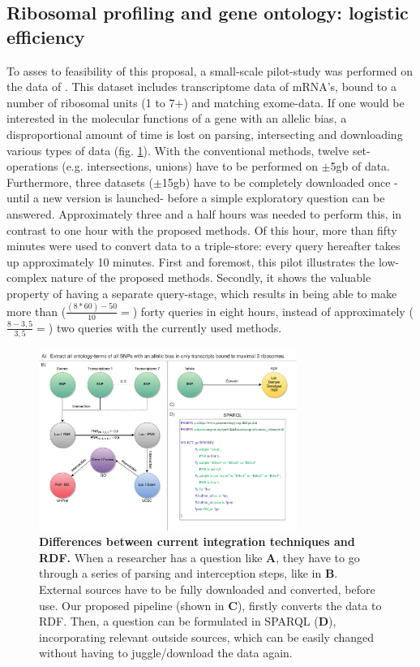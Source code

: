 \documentclass[twoside,fontsize=12pt]{article}
\begin{document}
\subsection*{Ribosomal profiling and gene ontology: logistic efficiency}
To asses to feasibility of this proposal, a small-scale pilot-study was performed on the data of \citet{VanHeesch2014}. This dataset includes transcriptome data of mRNA's, bound to a number of ribosomal units (1 to 7+) and matching exome-data. If one would be interested in the molecular functions of a gene with an allelic bias, a disproportional amount of time is lost on parsing, intersecting and downloading various types of data (fig. \ref{fig:awesome_image}). With the conventional methods, twelve set-operations (e.g. intersections, unions) have to be performed on $\pm$5gb of data. Furthermore, three datasets ($\pm$15gb) have to be completely downloaded once -until a new version is launched- before a simple exploratory question can be answered. Approximately three and a half hours was needed to perform this, in contrast to one hour with the proposed methods. Of this hour, more than fifty minutes were used to convert data to a triple-store: every query hereafter takes up approximately 10 minutes. First and foremost, this pilot illustrates the low-complex nature of the proposed methods. Secondly, it shows the valuable property of having a separate query-stage, which results in being able to make more than ($\frac{(8*60)-50}{10}= $) forty queries in eight hours, instead of approximately ($\frac{8-3,5}{3,5}= $) two queries with the currently used methods.
\begin{figure}[h!]
    \centering
    \includegraphics[width=0.75\textwidth]{DifferencesInDoingThings}
    \caption{\textbf{Differences between current integration techniques and RDF.} When a researcher has a question like \textbf{A}, they have to go through a series of parsing and interception steps, like in \textbf{B}. External sources have to be fully downloaded and converted, before use. Our proposed pipeline (shown in \textbf{C}), firstly converts the data to RDF. Then, a question can be formulated in SPARQL (\textbf{D}), incorporating relevant outside sources, which can be easily changed without having to juggle/download the data again.}
    \label{fig:awesome_image}
\end{figure}
\end{document}
